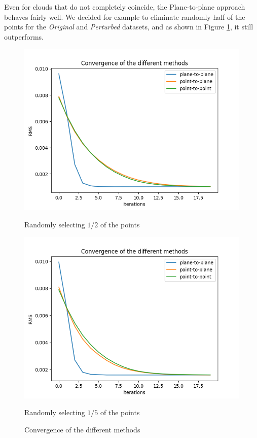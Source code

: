 \documentclass[11pt,letterpaper,leqno]{article}
\begin{document}
Even for clouds that do not completely coincide, the Plane-to-plane approach behaves fairly well. We decided for example to eliminate randomly half of the points for the \textit{Original} and \textit{Perturbed} datasets, and as shown in Figure \ref{fig:comp3}, it still outperforms.

\begin{figure}[ht!]
    \centering
    \begin{minipage}{0.5\linewidth}
    \includegraphics[width=\linewidth]{img/comparison_3.png}
    \caption{Randomly selecting $1/2$ of the points}
    \end{minipage}\hfill
    \begin{minipage}{0.5\linewidth}
    \includegraphics[width=\linewidth]{img/comparison_4.png}
    \caption{Randomly selecting $1/5$ of the points}
    \end{minipage}
    \caption{Convergence of the different methods}
    \label{fig:comp3}
\end{figure}
\end{document}
